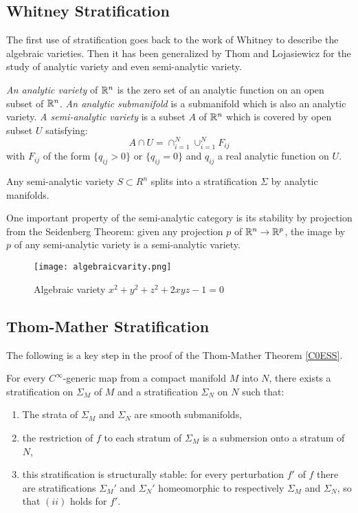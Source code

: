 \documentclass[11pt,openany,leqno]{article}
\begin{document}
\subsection{Whitney Stratification}
The first use of stratification goes back to the work of Whitney to describe the algebraic  varieties. Then it has been generalized by Thom 
and Lojasiewicz for the study of analytic variety and even semi-analytic variety. 

\begin{defi}
\emph{An analytic variety} of $\mathbb R^n$  is  the zero set of an analytic function on an open subset of $\mathbb R^n$. \emph{An analytic submanifold} is a submanifold which is also an analytic variety. \emph{A semi-analytic variety} is a subset $A$ of  $\mathbb R^n$ which is covered by open subset $U$ satisfying:
\[A\cap U =  \cap_{i=1}^N\cup_{i=1}^N F_{ij}\]
with $F_{ij}$ of the form $\{q_{ij} >0\}$ or $\{q_{ij} =0\}$ and $q_{ij}$ a real analytic function on $U$. 
\end{defi}

\begin{thm}
Any semi-analytic variety $S\subset R^n$ splits into a stratification $\Sigma$ by analytic manifolds.
\end{thm}
  One important property of the semi-analytic category is its stability by projection from the Seidenberg Theorem: given any projection $p$ of $\mathbb R^n\to \mathbb R^p$, the image by $p$ of any  semi-analytic variety is a semi-analytic variety. 
  

  \begin{figure}
	\centering
		\texttt{[image: algebraicvarity.png]}
	\caption{Algebraic variety $x^2+y^2+z^2+2xyz-1=0$}
\end{figure}
       

\subsection{Thom-Mather Stratification}
The following is a key step in the proof of the Thom-Mather Theorem \ref{C0ESS}. 
\begin{thm}
For every $C^\infty$-generic map from a compact manifold $M$ into $N$, there exists a stratification on $\Sigma_M$ of $M$ and a stratification $\Sigma_N$ on $N$ such that:\begin{enumerate}[$(i)$]
\item The strata of $\Sigma_M$ and $\Sigma_N$ are smooth submanifolds,  
\item the restriction of $f$ to each stratum of $\Sigma_M$ is a submersion onto a stratum of $N$,
\item this stratification is structurally stable: for every perturbation $f'$ of $f$ there are stratifications $\Sigma_M'$ and $\Sigma_N'$ homeomorphic  to respectively  $\Sigma_M$ and $\Sigma_N$, so that $(ii)$ holds for $f'$.\end{enumerate}
\end{thm}
\end{document}
